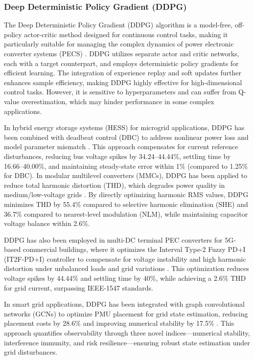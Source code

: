 \subsubsection{Deep Deterministic Policy Gradient (DDPG)}  

The Deep Deterministic Policy Gradient (DDPG) algorithm is a model-free, off-policy actor-critic method designed for continuous control tasks, making it particularly suitable for managing the complex dynamics of power electronic converter systems (PECS) \cite{lillicrap2015continuous}. DDPG utilizes separate actor and critic networks, each with a target counterpart, and employs deterministic policy gradients for efficient learning. The integration of experience replay and soft updates further enhances sample efficiency, making DDPG highly effective for high-dimensional control tasks. However, it is sensitive to hyperparameters and can suffer from Q-value overestimation, which may hinder performance in some complex applications.

In hybrid energy storage systems (HESS) for microgrid applications, DDPG has been combined with deadbeat control (DBC) to address nonlinear power loss and model parameter mismatch \cite{zhang2025deep}. This approach compensates for current reference disturbances, reducing bus voltage spikes by 34.24–44.44\%, settling time by 16.66–40.00\%, and maintaining steady-state error within 1\% (compared to 1.25\% for DBC). In modular multilevel converters (MMCs), DDPG has been applied to reduce total harmonic distortion (THD), which degrades power quality in medium/low-voltage grids \cite{qin2024level}. By directly optimizing harmonic RMS values, DDPG minimizes THD by 55.4\% compared to selective harmonic elimination (SHE) and 36.7\% compared to nearest-level modulation (NLM), while maintaining capacitor voltage balance within 2.6\%.

DDPG has also been employed in multi-DC terminal PEC converters for 5G-based commercial buildings, where it optimizes the Interval Type-2 Fuzzy PD+I (IT2F-PD+I) controller to compensate for voltage instability and high harmonic distortion under unbalanced loads and grid variations \cite{gheisarnejad2025optimal}. This optimization reduces voltage spikes by 44.44\% and settling time by 40\%, while achieving a 2.6\% THD for grid current, surpassing IEEE-1547 standards.

In smart grid applications, DDPG has been integrated with graph convolutional networks (GCNs) to optimize PMU placement for grid state estimation, reducing placement costs by 28.6\% and improving numerical stability by 17.5\% \cite{zhou2024deep}. This approach quantifies observability through three novel indices—numerical stability, interference immunity, and risk resilience—ensuring robust state estimation under grid disturbances.

